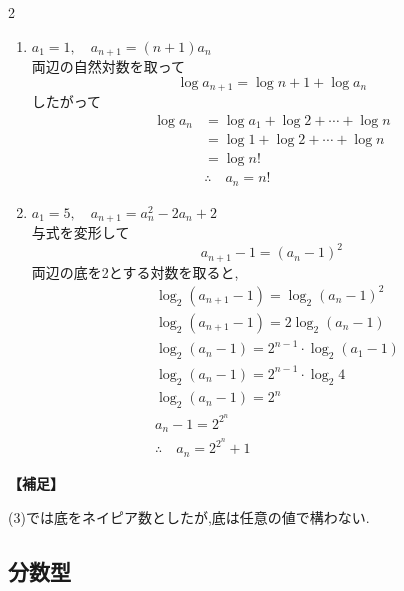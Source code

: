 \documentclass[dvipdfmx,a4paper,11pt,fleqn,openany]{jsbook}
\begin{document}
\begin{multicols*}{2}
\begin{enumerate}[label=(\arabic*),parsep=3pt]
\begin{align*}
            \end{align*}
      \item $\displaystyle a_1=1,\quad a_{n+1}=(n+1)a_n$\\
            両辺の自然対数を取って
            \[
              \log a_{n+1}=\log{n+1}+\log a_n
            \]
            したがって
            \begin{align*}
              \log a_n&=\log a_1 + \log{2}+\cdots+ \log{n}\\
              &=\log 1 + \log{2}+\cdots +\log{n}\\
              &=\log n!\\
              &\therefore \quad a_n=n!
            \end{align*}
      \item $\displaystyle a_1=5,\quad a_{n+1}=a_n^2-2a_n+2$\\
            与式を変形して
            \[
              a_{n+1}-1=(a_n-1)^2
            \]
            両辺の底を2とする対数を取ると,
            \begin{align*}
              &\log_2{(a_{n+1}-1)}=\log_2{(a_n-1)^2}\\
              &\log_2{(a_{n+1}-1)}=2\log_2{(a_n-1)}\\
              &\log_2{(a_n-1)}=2^{n-1}\cdot\log_2{(a_1-1)}\\
              &\log_2{(a_n-1)}=2^{n-1}\cdot\log_2{4}\\
              &\log_2{(a_n-1)}=2^{n}\\
              &a_n-1=2^{2^{n}}\\
              &\therefore \quad a_n=2^{2^{n}}+1
            \end{align*}
    \end{enumerate}
    \noindent\textbf{【補足】}

    (3)では底をネイピア数としたが,底は任意の値で構わない.

  \subsection{分数型}

\end{multicols*}
\end{document}

